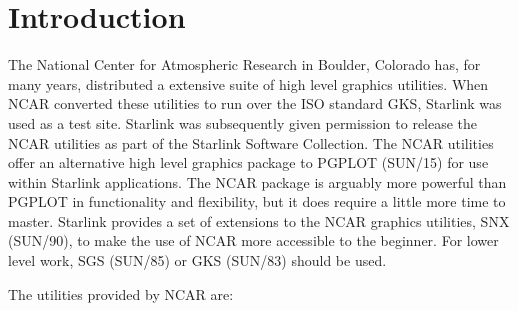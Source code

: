 \newpage

\section{Introduction}

The National Center for Atmospheric Research in Boulder, Colorado has, for
many years, distributed a extensive suite of high level graphics
utilities.
When NCAR converted these utilities to run over the ISO standard GKS, Starlink
was used as a test site.
Starlink was subsequently given permission to release the NCAR utilities as
part of the Starlink Software Collection.
The NCAR utilities offer an alternative high level graphics package to PGPLOT 
(SUN/15) for use within Starlink applications.
The NCAR package is arguably more powerful than PGPLOT in functionality and 
flexibility, but it does require a little more time to master.
Starlink provides a set of extensions to the NCAR graphics utilities,
SNX (SUN/90), to make the use of NCAR more accessible to the beginner.
For lower level work, SGS (SUN/85) or GKS (SUN/83) should be used.

The utilities provided by NCAR are:

